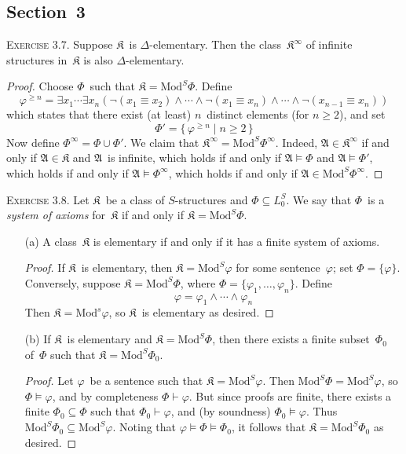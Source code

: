 \documentclass[letterpaper]{article}
\newcommand{\lequ}{\equiv}
\newcommand{\proves}{\vdash}
\newcommand{\union}{\cup}
\newcommand{\K}{\mathfrak{K}}
\newcommand{\mods}{\mathrm{Mod}}
\newcommand{\A}{\mathfrak{A}}
\theoremstyle{remark}
\begin{document}
\subsection*{Section~3}
\noindent\textsc{Exercise 3.7.}
Suppose $\K$~is $\Delta$-elementary. Then the class~$\K^\infty$ of infinite structures in~$\K$ is also $\Delta$-elementary.
\begin{proof}
Choose $\Phi$~such that $\K=\mods^S\Phi$. Define
$$\varphi^{\ge n}=\exists x_1\cdots\exists x_n(\lnot(x_1\lequ x_2)\land\cdots\land\lnot(x_1\lequ x_n)\land\cdots\land\lnot(x_{n-1}\lequ x_n))$$
which states that there exist (at least) $n$~distinct elements (for $n\ge 2$), and set
$$\Phi'=\{\,\varphi^{\ge n}\mid n\ge 2\,\}$$
Now define $\Phi^\infty=\Phi\union\Phi'$. We claim that $\K^\infty=\mods^S\Phi^\infty$. Indeed, $\A\in\K^\infty$ if and only if $\A\in\K$ and $\A$~is infinite, which holds if and only if $\A\models\Phi$ and $\A\models\Phi'$, which holds if and only if $\A\models\Phi^\infty$, which holds if and only if $\A\in\mods^S\Phi^\infty$.
\end{proof}

\noindent\textsc{Exercise 3.8.}
Let $\K$~be a class of $S$-structures and $\Phi\subseteq L_0^S$. We say that $\Phi$~is a \emph{system of axioms} for~$\K$ if and only if $\K=\mods^S\Phi$.
\begin{enumerate}
\item[(a)] A class~$\K$ is elementary if and only if it has a finite system of axioms.
\begin{proof}
If $\K$~is elementary, then $\K=\mods^S\varphi$ for some sentence~$\varphi$; set $\Phi=\{\varphi\}$. Conversely, suppose $\K=\mods^S\Phi$, where $\Phi=\{\varphi_1,\ldots,\varphi_n\}$. Define
$$\varphi=\varphi_1\land\cdots\land\varphi_n$$
Then $\K=\mods^s\varphi$, so $\K$~is elementary as desired.
\end{proof}
\item[(b)] If $\K$~is elementary and $\K=\mods^S\Phi$, then there exists a finite subset~$\Phi_0$ of~$\Phi$ such that $\K=\mods^S\Phi_0$.
\begin{proof}
Let $\varphi$~be a sentence such that $\K=\mods^S\varphi$. Then $\mods^S\Phi=\mods^S\varphi$, so $\Phi\models\varphi$, and by completeness $\Phi\proves\varphi$. But since proofs are finite, there exists a finite $\Phi_0\subseteq\Phi$ such that $\Phi_0\proves\varphi$, and (by soundness) $\Phi_0\models\varphi$. Thus $\mods^S\Phi_0\subseteq\mods^S\varphi$. Noting that $\varphi\models\Phi\models\Phi_0$, it follows that $\K=\mods^S\Phi_0$ as desired.
\end{proof}
\end{enumerate}
\end{document}
